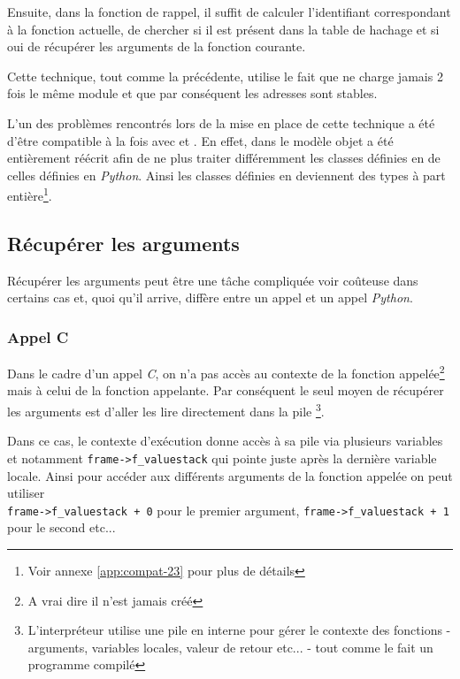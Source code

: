 Ensuite, dans la fonction de rappel, il suffit de calculer l'identifiant correspondant à la fonction actuelle, de chercher si il est présent dans la table de hachage et si oui de récupérer les arguments de la fonction courante.

\begin{note}
Cette technique, tout comme la précédente, utilise le fait que \Python ne charge jamais 2 fois le même module et que par conséquent les adresses sont stables.
\end{note}

\begin{note}
L'un des problèmes rencontrés lors de la mise en place de cette technique a été d'être compatible à la fois avec  et . En effet, dans  le modèle objet a été entièrement réécrit afin de ne plus traiter différemment les classes définies en \C de celles définies en \emph{Python}. Ainsi les classes définies en \Python deviennent des types à part entière\footnote{Voir annexe \vref{app:compat-23} pour plus de détails}.
\end{note}

\subsection{Récupérer les arguments}
Récupérer les arguments peut être une tâche compliquée voir coûteuse dans certains cas et, quoi qu'il arrive, diffère entre un appel \C et un appel \emph{Python}.

\subsubsection*{Appel C}
Dans le cadre d'un appel \emph{C}, on n'a pas accès au contexte de la fonction appelée\footnote{A vrai dire il n'est jamais créé} mais à celui de la fonction appelante. Par conséquent le seul moyen de récupérer les arguments est d'aller les lire directement dans la pile \Python\footnote{L'interpréteur \Python utilise une pile en interne pour gérer le contexte des fonctions - arguments, variables locales, valeur de retour etc... - tout comme le fait un programme \C compilé}.

Dans ce cas, le contexte d'exécution donne accès à sa pile via plusieurs variables et notamment \verb|frame->f_valuestack| qui pointe juste après la dernière variable locale. Ainsi pour accéder aux différents arguments de la fonction \C appelée on peut utiliser\\ \verb|frame->f_valuestack + 0| pour le premier argument, \verb|frame->f_valuestack + 1| pour le second etc...


